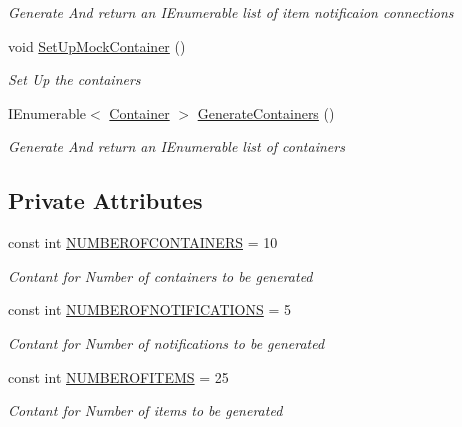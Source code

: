 \begin{DoxyCompactItemize}
\begin{DoxyCompactList}\small\item\em Generate And return an I\+Enumerable list of item notificaion connections \end{DoxyCompactList}\item 
void \mbox{\hyperlink{class_gtd_app_1_1_logic_1_1_tests_1_1_business_logic_tests_afedc2d2b39d2fa9deff98a447af6c7a4}{Set\+Up\+Mock\+Container}} ()
\begin{DoxyCompactList}\small\item\em Set Up the containers \end{DoxyCompactList}\item 
I\+Enumerable$<$ \mbox{\hyperlink{class_gtd_app_1_1_data_1_1_container}{Container}} $>$ \mbox{\hyperlink{class_gtd_app_1_1_logic_1_1_tests_1_1_business_logic_tests_a9e647146c5d38fd325f48561d2e3b383}{Generate\+Containers}} ()
\begin{DoxyCompactList}\small\item\em Generate And return an I\+Enumerable list of containers \end{DoxyCompactList}\end{DoxyCompactItemize}
\subsection*{Private Attributes}
\begin{DoxyCompactItemize}
\item 
const int \mbox{\hyperlink{class_gtd_app_1_1_logic_1_1_tests_1_1_business_logic_tests_a4666d3660d7a7a9d6eaff03544d6aa14}{N\+U\+M\+B\+E\+R\+O\+F\+C\+O\+N\+T\+A\+I\+N\+E\+RS}} = 10
\begin{DoxyCompactList}\small\item\em Contant for Number of containers to be generated \end{DoxyCompactList}\item 
const int \mbox{\hyperlink{class_gtd_app_1_1_logic_1_1_tests_1_1_business_logic_tests_aeb433fc5515bc8b458dd06877cea10ec}{N\+U\+M\+B\+E\+R\+O\+F\+N\+O\+T\+I\+F\+I\+C\+A\+T\+I\+O\+NS}} = 5
\begin{DoxyCompactList}\small\item\em Contant for Number of notifications to be generated \end{DoxyCompactList}\item 
const int \mbox{\hyperlink{class_gtd_app_1_1_logic_1_1_tests_1_1_business_logic_tests_a77fa44503539e4f3d30c9d47a9ae84d8}{N\+U\+M\+B\+E\+R\+O\+F\+I\+T\+E\+MS}} = 25
\begin{DoxyCompactList}\small\item\em Contant for Number of items to be generated \end{DoxyCompactList}\end{DoxyCompactItemize}


